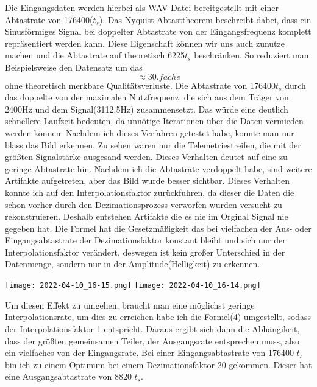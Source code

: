 \begin{multicols*}{2}
    Die Eingangsdaten werden hierbei als WAV Datei bereitgestellt mit einer Abtastrate von 176400(\( t_s \)). Das Nyquist-Abtasttheorem beschreibt dabei, dass ein Sinusförmiges Signal bei doppelter Abtastrate von der Eingangsfrequenz komplett repräsentiert werden kann. Diese Eigenschaft können wir uns auch zunutze machen und die Abtastrate auf theoretisch 6225\( t_s \) beschränken. So reduziert man Beispielsweise den Datensatz um das $$\approx 30.fache$$ ohne theoretisch merkbare Qualitätsverluste. Die Abtastrate von 176400\( t_s \) durch das doppelte von der maximalen Nutzfrequenz, die sich aus dem Träger von 2400Hz und dem Signal(3112.5Hz) zusammensetzt. Das würde eine deutlich schnellere Laufzeit bedeuten, da unnötige Iterationen über die Daten vermieden werden können. Nachdem ich dieses Verfahren getestet habe, konnte man nur blass das Bild erkennen. Zu sehen waren nur die Telemetriestreifen, die mit der größten Signalstärke ausgesand werden. Dieses Verhalten deutet auf eine zu geringe Abtastrate hin. Nachdem ich die Abtastrate verdoppelt habe, sind weitere Artifakte aufgetreten, aber das Bild wurde besser sichtbar. Dieses Verhalten konnte ich auf den Interpolationsfaktor zurückfuhren, da dieser die Daten die schon vorher durch den Dezimationsprozess verworfen wurden versucht zu rekonstruieren. Deshalb entstehen Artifakte die es nie im Orginal Signal nie gegeben hat. Die Formel hat die Gesetzmäßigkeit das bei vielfachen der Aus- oder Eingangsabtastrate der Dezimationsfaktor konstant bleibt und sich nur der Interpolationsfaktor verändert, deswegen ist kein großer Unterschied in der Datenmenge, sondern nur in der Amplitude(Helligkeit) zu erkennen.

    \begin{center}
        \centering
        \texttt{[image: 2022-04-10\_16-15.png]}
        \texttt{[image: 2022-04-10\_16-14.png]}
    \end{center} 

    Um diesen Effekt zu umgehen, braucht man eine möglichst geringe Interpolationsrate, um dies zu erreichen habe ich die Formel(4) umgestellt, sodass der Interpolationsfaktor 1 entspricht. Daraus ergibt sich dann die Abhängikeit, dass der größten gemeinsamen Teiler, der Ausgangsrate entsprechen muss, also ein vielfaches von der Eingangsrate. Bei einer Eingangsabtastrate von 176400 \( t_s \) bin ich zu einem Optimum bei einem Dezimationsfaktor 20 gekommen. Dieser hat eine Ausgangsabtastrate von 8820 \( t_s \). 



\end{multicols*}
